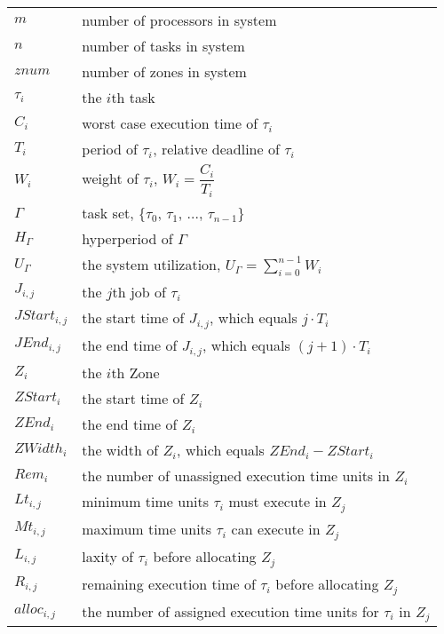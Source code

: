 \documentclass{article}
\begin{document}
\centering

\begin{tabular}{l|l}
	\hline
	$m$            & number of processors in system \\
	$n$            & number of tasks in system \\
	$znum$         & number of zones in system \\
	$\tau_i$       & the $i$th task \\
	$C_i$          & worst case execution time of $\tau_i$ \\
	$T_i$          & period of $\tau_i$, relative deadline of $\tau_i$ \\
	$W_i$          & weight of $\tau_i$, $W_i = \dfrac{C_i}{T_i}$ \\
	$\Gamma$       & task set, \{$\tau_0$, $\tau_1$, ..., $\tau_{n-1}$\} \\
	$H_\Gamma$     & hyperperiod of $\Gamma$ \\
	$U_\Gamma$     & the system utilization, $U_\Gamma = \sum\limits_{i=0}^{n-1} W_i$ \\
	$J_{i,j}$      & the $j$th job of $\tau_i$ \\
	$JStart_{i,j}$ & the start time of $J_{i,j}$, which equals $j \cdot T_i$ \\
	$JEnd_{i,j}$   & the end time of $J_{i,j}$, which equals $(j+1) \cdot T_i$ \\
	$Z_i$					 & the $i$th Zone\\
	$ZStart_i$     & the start time of $Z_i$ \\
	$ZEnd_i$       & the end time of $Z_i$ \\
	$ZWidth_i$     & the width of $Z_i$, which equals $ZEnd_i-ZStart_i$ \\
	$Rem_i$        & the number of unassigned execution time units in $Z_i$ \\
	$Lt_{i,j}$     & minimum time units $\tau_i$ must execute in $Z_j$ \\
	$Mt_{i,j}$     & maximum time units $\tau_i$ can execute in $Z_j$ \\
	$L_{i,j}$      & laxity of $\tau_i$ before allocating $Z_j$ \\
	$R_{i,j}$      & remaining execution time of $\tau_i$ before allocating $Z_j$ \\
	$alloc_{i,j}$  & the number of assigned execution time units for $\tau_i$ in $Z_j$ \\
	\hline
\end{tabular}
\end{document}
